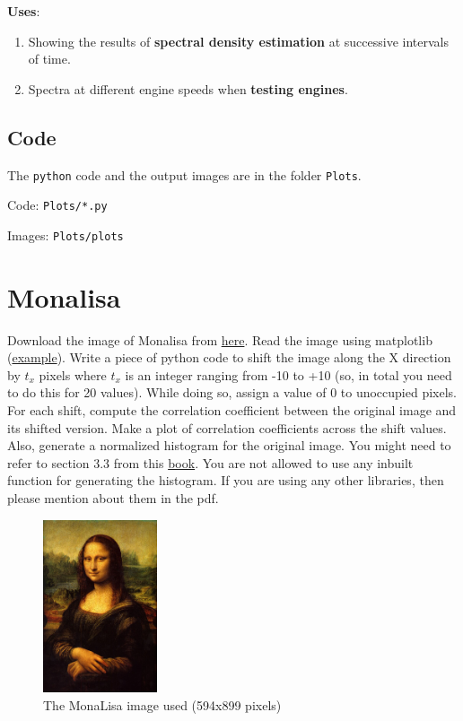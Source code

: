 \documentclass{article}
\begin{document}
\textbf{{Uses}}:
\begin{enumerate}
    \item Showing the results of \textbf{spectral density estimation} at successive intervals of time.
    \item Spectra at different engine speeds when \textbf{testing engines}.
\end{enumerate}

\subsection*{Code}
The \texttt{python} code and the output images are in the
folder \texttt{Plots}.

Code: \texttt{Plots/*.py}

Images: \texttt{Plots/plots}

\setcounter{equation}{0}

\section{Monalisa}

\begin{tcolorbox}
    Download the image of Monalisa from
    \href{https://en.wikipedia.org/wiki/File:Mona_Lisa.jpg}{here}. Read the image using
    matplotlib (\href{https://people.ciirc.cvut.cz/~xmatousm/mfftdv/lab1.html}
    {example}). Write a piece of python code to shift the image along the X
    direction by $t_x$ pixels where $t_x$ is an integer ranging from -10 to +10
    (so, in total you need to do this for 20 values). While doing so, assign a value of
    0 to unoccupied pixels. For each shift, compute the correlation coefficient between
    the original image and its shifted version. Make a plot of correlation coefficients
    across the shift values. Also, generate a normalized histogram for the original
    image. You might need to refer to section 3.3 from this
    \href{https://dl.icdst.org/pdfs/files4/01c56e081202b62bd7d3b4f8545775fb.pdf}{book}.
    You are not allowed to use any inbuilt function for generating the histogram. If
    you are using any other libraries, then please mention about them in the pdf.
\end{tcolorbox}

\begin{figure}[H]
    \centering
    \includegraphics[width=0.3\textwidth]{assets/monalisa/Mona_Lisa.jpg}
    \caption{The MonaLisa image used (594x899 pixels)}
    \label{fig:Mona_Lisa}
\end{figure}
\end{document}

